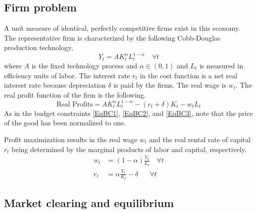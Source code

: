 \documentclass[letterpaper,12pt]{article}
\theoremstyle{definition}
\begin{document}
\begin{spacing}{1.5}
  \subsection{Firm problem}\label{SecModelGenFirm}

    A unit measure of identical, perfectly competitive firms exist in this economy. The representative firm is characterized by the following Cobb-Douglas production technology,
    \begin{equation}\label{EqCobbDougProd}
       Y_t = A K_t^\alpha L_t^{1-\alpha} \quad \forall t
    \end{equation}
    where $A$ is the fixed technology process and $\alpha\in(0,1)$ and $L_t$ is measured in efficiency units of labor. The interest rate $r_t$ in the cost function is a net real interest rate because depreciation $\delta$ is paid by the firms. The real wage is $w_t$. The real profit function of the firm is the following.
    \begin{equation}\label{EqFirmProfit}
       \text{Real Profits} = A K_t^\alpha L_t^{1-\alpha} - (r_t + \delta)K_t - w_t L_t
    \end{equation}
    As in the budget constraints \eqref{EqBC1}, \eqref{EqBC2}, and \eqref{EqBC3}, note that the price of the good has been normalized to one.

    Profit maximization results in the real wage $w_t$ and the real rental rate of capital $r_t$ being determined by the marginal products of labor and capital, respectively.
    \begin{align}
       w_t &= (1-\alpha)\frac{Y_t}{L_t} \quad \forall t \label{EqFOCwage}\\
       r_t &= \alpha\frac{Y_t}{K_t} - \delta \quad\:\:\: \forall t \label{EqFOCrate}
    \end{align}


  \subsection{Market clearing and equilibrium}\label{SecMCandEqlbm}


\end{spacing}
\end{document}
